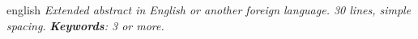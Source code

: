 \par
\begin{resumo}[Abstract]
	\begin{otherlanguage*}{english}
		\emph{
			Extended abstract in English or another foreign language. 30 lines, simple spacing.
			\lipsum[5]
		}
		\vspace{\onelineskip}
		\noindent
		\emph{	
			\textbf{Keywords}: 3 or more.
		}
	\end{otherlanguage*}
\end{resumo}
